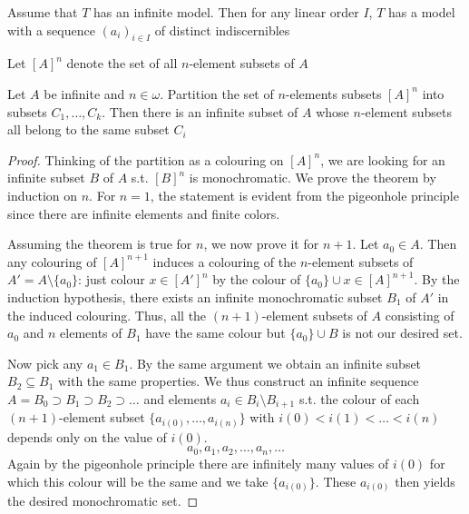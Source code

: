 \documentclass[11pt]{article}
\begin{document}
\begin{corollary}[]
Assume that \(T\) has an infinite model. Then for any linear order \(I\), \(T\) has a model with
a sequence \((a_i)_{i\in I}\) of distinct indiscernibles
\end{corollary}

Let \([A]^n\) denote the set of all \(n\)-element subsets of \(A\)

\begin{theorem}[Ramsey]
Let \(A\) be infinite and \(n\in\omega\). Partition the set of \(n\)-elements subsets \([A]^n\) into
subsets \(C_1,\dots,C_k\). Then there is an infinite subset of \(A\) whose \(n\)-element subsets all
belong to the same subset \(C_i\)
\end{theorem}

\begin{proof}
Thinking of the partition as a colouring on \([A]^n\), we are looking for an infinite
subset \(B\) of \(A\) s.t. \([B]^n\) is monochromatic. We prove the theorem by induction
on \(n\). For \(n=1\), the statement is evident from the pigeonhole principle since there are
infinite elements and finite colors.

Assuming the theorem is true for \(n\), we now prove it for \(n+1\). Let \(a_0\in A\). Then any
colouring of \([A]^{n+1}\) induces a colouring of the \(n\)-element subsets of \(A'=A\setminus\{a_0\}\):
just colour \(x\in[A']^n\) by the colour of \(\{a_0\}\cup x\in[A]^{n+1}\). By the induction hypothesis,
there exists an infinite monochromatic subset \(B_1\) of \(A'\) in the induced colouring. Thus,
all the \((n+1)\)-element subsets of \(A\) consisting of \(a_0\) and \(n\) elements of \(B_1\)
have the same colour but \(\{a_0\}\cup B\) is not our desired set.

Now pick any \(a_1\in B_1\). By the same argument we obtain an infinite
subset \(B_2\subseteq B_1\) with the same properties. We thus construct an infinite
sequence \(A=B_0\supset B_1\supset B_2\supset\dots\) and elements \(a_i\in B_i\setminus B_{i+1}\) s.t.
the colour of each \((n+1)\)-element subset \(\{a_{i(0)},\dots,a_{i(n)}\}\) with \(i(0)<i(1)<\dots<i(n)\)
depends only on the value of \(i(0)\).
\begin{equation*}
a_0,a_1,a_2,\dots,a_n,\dots
\end{equation*}
Again by the pigeonhole principle there are infinitely
many values of \(i(0)\) for which this colour will be the same and we take \(\{a_{i(0)}\}\).
These \(a_{i(0)}\) then yields
the desired monochromatic set.
\end{proof}
\end{document}
